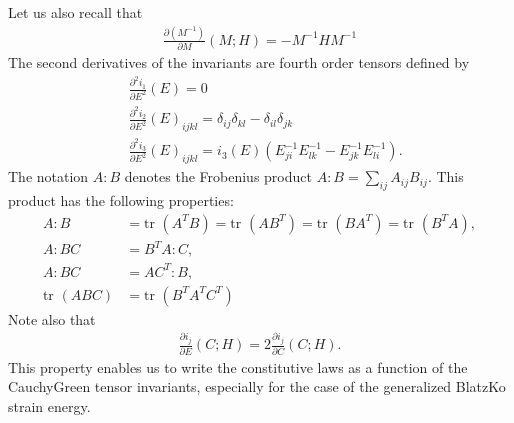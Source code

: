 \documentclass[a4paper,11pt,english]{sphinxmanual}
\begin{document}
Let us also recall that
\begin{equation*}
\begin{split}\frac{\partial (M^{-1})}{\partial M}(M;H) = -M^{-1}HM^{-1}\end{split}
\end{equation*}
The second derivatives of the invariants are fourth order tensors defined by
\begin{equation*}
\begin{split}&\frac{\partial^2 i_1}{\partial E^2}(E) = 0\\
&\frac{\partial^2 i_2}{\partial E^2}(E)_{ijkl} = \delta_{ij}\delta_{kl} - \delta_{il}\delta_{jk} \\
&\frac{\partial^2 i_3}{\partial E^2}(E)_{ijkl} = i_3(E) (E^{-1}_{ji}E^{-1}_{lk} - E^{-1}_{jk}E^{-1}_{li}).\end{split}
\end{equation*}
The notation \(A:B\) denotes the Frobenius product \(A:B = \displaystyle\sum_{ij}A_{ij}B_{ij}\). This product has the following properties:
\begin{equation*}
\begin{split}A:B &= \mbox{tr }(A^TB) = \mbox{tr }(AB^T) = \mbox{tr }(BA^T) = \mbox{tr }(B^TA),\\
A:BC &= B^TA:C,\\
A:BC &= AC^T:B,\\
\mbox{tr }(ABC) &= \mbox{tr }(B^TA^TC^T)\end{split}
\end{equation*}
Note also that
\begin{equation*}
\begin{split}\frac{\partial i_j}{\partial E}(C;H) = 2 \frac{\partial i_j}{\partial C}(C;H).\end{split}
\end{equation*}
This property enables us to write the constitutive laws as a function of the Cauchy\sphinxhyphen{}Green tensor invariants, especially for the case of the generalized Blatz\sphinxhyphen{}Ko strain energy.
\end{document}
